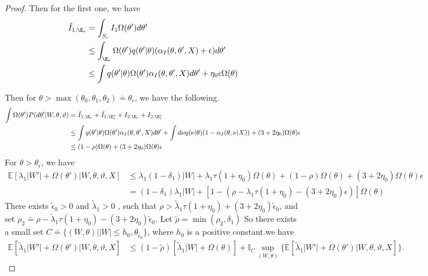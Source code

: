 \begin{proof}
Then for the first one, we have 
\begin{align*}
\tilde{I}_{1,\E_\epsilon} &= \int_{S_\epsilon} I_1 \Omega(\theta') d\theta'\\
& \leq \int_{\E_\epsilon} \Omega(\theta')q(\theta' | \theta) (\alpha_I(\theta, \theta', X) + \epsilon) d\theta' \\
& \leq \int q(\theta' | \theta) \Omega(\theta')\alpha_I(\theta, \theta', X) d\theta' + \eta_0 \epsilon \Omega(\theta)
\end{align*}

Then for $\theta > \max(\theta_0, \theta_1, \theta_2)\doteq \theta_\epsilon$, we have the following. 
\begin{align*}
  \int \Omega(\theta') P(d\theta'| W, \theta, \vartheta)  
  &= \tilde{I}_{1,\E_\epsilon} + \tilde{I}_{1,\E^c_\epsilon} + I_{2,\E_{\epsilon}} + I_{2,\E_{\epsilon}^c} \\
  & \leq \int q(\theta' | \theta) \Omega(\theta')\alpha_I(\theta, \theta', X) d\theta'  + \int d\nu q(\nu | \theta) (1 - \alpha_I(\theta, \nu | X)) + (3 + 2\eta_0) \Omega(\theta) \epsilon\\
  & \leq (1 - \rho) \Omega(\theta) + (3 + 2\eta_0) \Omega(\theta) \epsilon
\end{align*}
For $\theta > \theta_\epsilon$, we have
\begin{align*}
\mathbb{E}[\lambda_1 | W'| + \Omega(\theta')| W, \theta, \vartheta, X] & \le \lambda_1(1 - \delta_1)|W| + \lambda_1 \tau (1 + \eta_0)\Omega(\theta) +  (1 - \rho) \Omega(\theta) + (3 + 2\eta_0) \Omega(\theta) \epsilon\\
& = (1 - \delta_1)\lambda_1 |W| + [1 - (\rho - \lambda_1 \tau (1 + \eta_0) - (3 + 2\eta_0)\epsilon)]\Omega(\theta) 
\end{align*}
There exists  $\tilde{\epsilon}_0 > 0$ and $\tilde{\lambda}_1 >0 $ , such that $\rho > \tilde{\lambda}_1 \tau (1 + \eta_0) + (3 + 2\eta_0)\tilde{\epsilon}_0$, and set $\rho_2  \doteq \rho - \tilde{\lambda}_1 \tau (1 + \eta_0) - (3 + 2\eta_0)\tilde{\epsilon}_0$. Let $\tilde{\rho} = \min(\rho_2, \delta_1)$ So there exists a small set $C \doteq \{(W, \theta) | |W| \leq h_0, \theta_{\tilde{\epsilon_0}} \}$, where $h_0$ is a positive constant.we have \begin{align*}
\mathbb{E}[\tilde{\lambda}_1 | W'| + \Omega(\theta')| W, \theta, \vartheta, X] &\le (1 - \tilde{\rho}) [\tilde{\lambda}_1 | W| + \Omega(\theta)] + 
\mathbb{I}_{C} \sup_{(W, \theta)} \{ \mathbb{E}[\tilde{\lambda}_1 | W'| + \Omega(\theta')| W, \theta, \vartheta, X] \}.  
\end{align*}

\end{proof}
